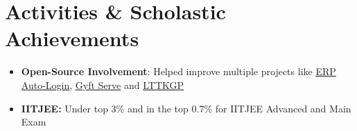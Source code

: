 \documentclass[letterpaper,11pt]{article}
\begin{document}
\section{Activities \& Scholastic Achievements}
\begin{itemize}[leftmargin=0.15in, label={}]
\item \textbf{Open-Source Involvement}: Helped improve multiple projects like {\href{https://github.com/metakgp/erp-auto-login} {ERP Auto-Login}}, {\href {https://github.com/metakgp/gyft-serve}{Gyft Serve}} and {\href{https://github.com/lttkgp}{LTTKGP}}


\item\textbf{IITJEE:} Under top 3\% and in the top 0.7\% for IITJEE Advanced and Main Exam



\end{itemize}


\end{document}
